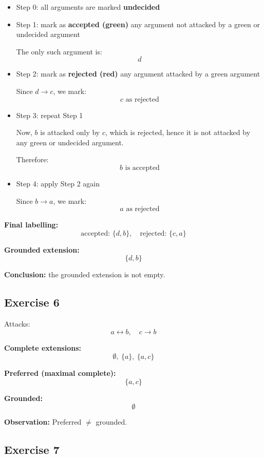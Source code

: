 \documentclass[11pt]{article}
\begin{document}
\begin{itemize}
    \item Step 0: all arguments are marked \textbf{undecided}

    \item Step 1: mark as \textbf{accepted (green)} any argument not attacked by a green or undecided argument

    The only such argument is:
    \[
    d
    \]

    \item Step 2: mark as \textbf{rejected (red)} any argument attacked by a green argument

    Since $d \to c$, we mark:
    \[
    c \text{ as rejected}
    \]

    \item Step 3: repeat Step 1

    Now, $b$ is attacked only by $c$, which is rejected, hence it is not attacked by any green or undecided argument.

    Therefore:
    \[
    b \text{ is accepted}
    \]

    \item Step 4: apply Step 2 again

    Since $b \to a$, we mark:
    \[
    a \text{ as rejected}
    \]
\end{itemize}

\textbf{Final labelling:}
\[
\text{accepted: } \{d, b\}, \quad
\text{rejected: } \{c, a\}
\]

\textbf{Grounded extension:}
\[
\{d, b\}
\]

\textbf{Conclusion:} the grounded extension is not empty.

\subsection{Exercise 6}

Attacks:
\[
a \leftrightarrow b,\quad c \to b
\]

\textbf{Complete extensions:}
\[
\emptyset,\ \{a\},\ \{a,c\}
\]

\textbf{Preferred (maximal complete):}
\[
\{a,c\}
\]

\textbf{Grounded:}
\[
\emptyset
\]

\textbf{Observation:}
Preferred $\neq$ grounded.

\subsection{Exercise 7}
\end{document}
